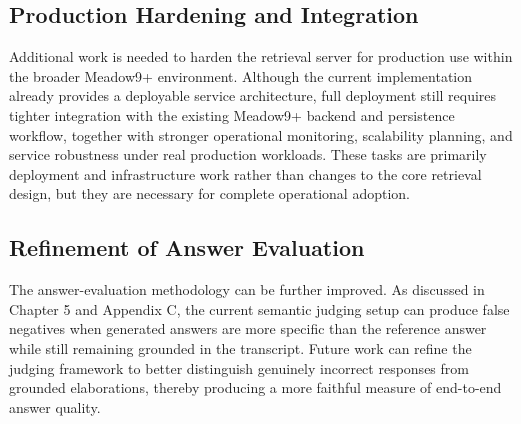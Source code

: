 \subsection{Production Hardening and Integration}
Additional work is needed to harden the retrieval server for production use within the broader Meadow9+ environment. Although the current implementation already provides a deployable service architecture, full deployment still requires tighter integration with the existing Meadow9+ backend and persistence workflow, together with stronger operational monitoring, scalability planning, and service robustness under real production workloads. These tasks are primarily deployment and infrastructure work rather than changes to the core retrieval design, but they are necessary for complete operational adoption.

\subsection{Refinement of Answer Evaluation}
The answer-evaluation methodology can be further improved. As discussed in Chapter 5 and Appendix C, the current semantic judging setup can produce false negatives when generated answers are more specific than the reference answer while still remaining grounded in the transcript. Future work can refine the judging framework to better distinguish genuinely incorrect responses from grounded elaborations, thereby producing a more faithful measure of end-to-end answer quality.
